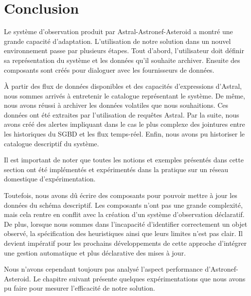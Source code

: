 \section{Conclusion}\label{sec:valid:domvision:conclusion}
Le système d'observation produit par Astral-Astronef-Asteroid a montré une grande capacité d'adaptation. L'utilisation de notre solution dans un nouvel environnement passe par plusieurs étapes. Tout d'abord, l'utilisateur doit définir sa représentation du système et les données qu'il souhaite archiver. Ensuite des composants sont créés pour dialoguer avec les fournisseurs de données.

À partir des flux de données disponibles et des capacités d'expressions d'Astral, nous sommes arrivés à entretenir le catalogue représentant le système. De même, nous avons réussi à archiver les données volatiles que nous souhaitions. Ces données ont été extraites par l'utilisation de requêtes Astral. Par la suite, nous avons créé des alertes impliquant dans le cas le plus complexe des jointures entre les historiques du SGBD et les flux temps-réel. Enfin, nous avons pu historiser le catalogue descriptif du système.

Il est important de noter que toutes les notions et exemples présentés dans cette section ont été implémentés et expérimentés dans la pratique sur un réseau domestique d'expérimentation.

Toutefois, nous avons dû écrire des composants pour pouvoir mettre à jour les données du schéma descriptif. Les composants n'ont pas une grande complexité, mais cela rentre en conflit avec la création d'un système d'observation déclaratif. De plus, lorsque nous sommes dans l'incapacité d'identifier correctement un objet observé, la spécification des heuristiques ainsi que leurs limites n'est pas clair. Il devient impératif pour les prochains développements de cette approche d'intégrer une gestion automatique et plus déclarative des mises à jour.

Nous n'avons cependant toujours pas analysé l'aspect performance d'Astronef-Asteroid. Le chapitre suivant présente quelques expérimentations que nous avons pu faire pour mesurer l'efficacité de notre solution.